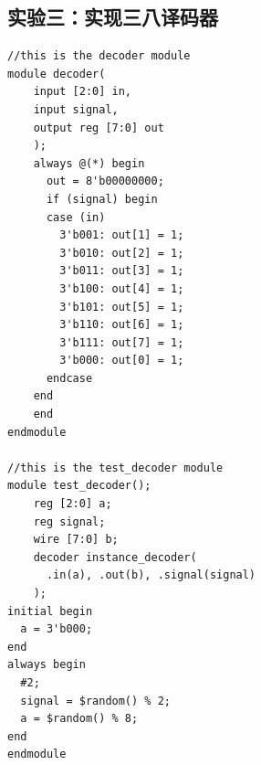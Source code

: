 \documentclass[zihao=5, UTF8]{article}
\theoremstyle{MyLineTheoremStyle} %
\theoremstyle{MyBlockTheoremStyle} %
\theoremstyle{MySubsubsectionStyle} %
\begin{document}
\subsection{实验三：实现三八译码器}
\begin{verbatim}
//this is the decoder module
module decoder(
    input [2:0] in,
    input signal,
    output reg [7:0] out
    );
    always @(*) begin
      out = 8'b00000000;
      if (signal) begin
      case (in)
        3'b001: out[1] = 1; 
        3'b010: out[2] = 1; 
        3'b011: out[3] = 1; 
        3'b100: out[4] = 1; 
        3'b101: out[5] = 1; 
        3'b110: out[6] = 1; 
        3'b111: out[7] = 1; 
        3'b000: out[0] = 1;  
      endcase
    end
    end
endmodule

//this is the test_decoder module
module test_decoder();
    reg [2:0] a;
    reg signal;
    wire [7:0] b;
    decoder instance_decoder(
      .in(a), .out(b), .signal(signal)
    );
initial begin
  a = 3'b000;
end
always begin
  #2;
  signal = $random() % 2;
  a = $random() % 8;
end
endmodule
\end{verbatim}
\end{document}
